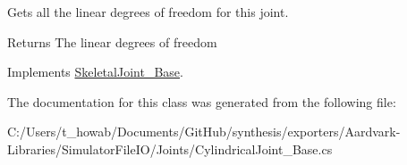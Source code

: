 Gets all the linear degrees of freedom for this joint. 

\begin{DoxyReturn}{Returns}
The linear degrees of freedom
\end{DoxyReturn}


Implements \hyperlink{class_skeletal_joint___base_a14564d8c44dfeef8b7a10044f2392cde}{Skeletal\+Joint\+\_\+\+Base}.



The documentation for this class was generated from the following file\+:\begin{DoxyCompactItemize}
\item 
C\+:/\+Users/t\+\_\+howab/\+Documents/\+Git\+Hub/synthesis/exporters/\+Aardvark-\/\+Libraries/\+Simulator\+File\+I\+O/\+Joints/Cylindrical\+Joint\+\_\+\+Base.\+cs\end{DoxyCompactItemize}
